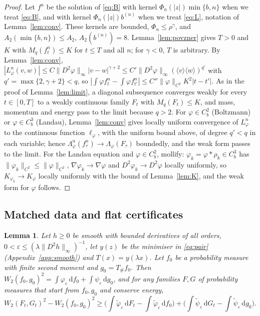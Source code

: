 \documentclass[11pt]{amsart}
\newtheorem{lemma}[theorem]{Lemma}
\theoremstyle{definition}
\newcommand{\dd}{\,\mathrm{d}}
\newcommand{\jb}[1]{\langle #1\rangle}
\begin{document}
\begin{proof}
Let $f^n$ be the solution of \eqref{eq:B} with kernel $\Phi_n(|z|)\min\{b,n\}$ when we treat \eqref{eq:B}, and with kernel $\Phi_n(|z|)b^{(n)}$ when we treat \eqref{eq:L}, notation of Lemma~\ref{lem:conv}. These kernels are bounded, $\Phi_n\le\rho^\gamma$, and $A_2(\min\{b,n\})\le A_2$, $A_2(b^{(n)})=8$. Lemma~\ref{lem:povzner} gives $T>0$ and $K$ with $M_q(f^n_t)\le K$ for $t\le T$ and all $n$; for $\gamma<0$, $T$ is arbitrary. By Lemma~\ref{lem:conv}, $|L^n_\varphi(v,w)|\le C\|D^2\varphi\|_\infty|v-w|^{\gamma+2}\le C'\|D^2\varphi\|_\infty(\jb{v}\jb{w})^{q'}$ with $q'=\max\{2,\gamma+2\}<q$, so $|\int\varphi f^n_t-\int\varphi f^n_{t'}|\le C''\|\varphi\|_{C^2}K^2|t-t'|$. As in the proof of Lemma~\ref{lem:limit}, a diagonal subsequence converges weakly for every $t\in[0,T]$ to a weakly continuous family $F_t$ with $M_q(F_t)\le K$, and mass, momentum and energy pass to the limit because $q>2$. For $\varphi\in C^2_b$ (Boltzmann) or $\varphi\in C^3_b$ (Landau), Lemma~\ref{lem:conv} gives locally uniform convergence of $L^n_\varphi$ to the continuous function $\ell_\varphi$, with the uniform bound above, of degree $q'<q$ in each variable; hence $\Lambda^n_\varphi(f^n_\tau)\to\Lambda_\varphi(F_\tau)$ boundedly, and the weak form passes to the limit. For the Landau equation and $\varphi\in C^2_b$, mollify: $\varphi_k=\varphi*\rho_k\in C^3_b$ has $\|\varphi_k\|_{C^2}\le\|\varphi\|_{C^2}$, $\nabla\varphi_k\to\nabla\varphi$ and $D^2\varphi_k\to D^2\varphi$ locally uniformly, so $K_{\varphi_k}\to K_\varphi$ locally uniformly with the bound of Lemma~\ref{lem:K}, and the weak form for $\varphi$ follows.
\end{proof}

\subsection{Matched data and flat certificates}

\begin{lemma}\label{lem:matched}
Let $h\ge0$ be smooth with bounded derivatives of all orders, $0<\varepsilon\le(\lambda\|D^2h\|_\infty)^{-1}$, let $y(z)$ be the minimiser in \eqref{eq:pair} (Appendix~\ref{app:smooth}) and $T(x)=y(\lambda x)$. Let $f_0$ be a probability measure with finite second moment and $g_0=T_\#f_0$. Then $W_2(f_0,g_0)^2=\int\varphi_\varepsilon\dd f_0+\int\psi_\varepsilon\dd g_0$, and for any families $F,G$ of probability measures that start from $f_0,g_0$ and conserve energy,
\[
W_2(F_t,G_t)^2-W_2(f_0,g_0)^2\ge\Big(\int\tilde\varphi_\varepsilon\dd F_t-\int\tilde\varphi_\varepsilon\dd f_0\Big)+\Big(\int\tilde\psi_\varepsilon\dd G_t-\int\tilde\psi_\varepsilon\dd g_0\Big).
\]
\end{lemma}
\end{document}
